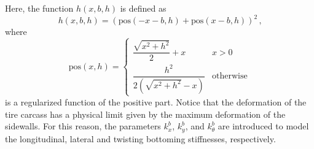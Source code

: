 %
Here, the function $h(x,b,h)$ is defined as
%
\begin{equation*}
  h(x,b,h) = \left(\mathrm{pos}(-x-b, h) + \mathrm{pos}(x-b, h)\right)^2 \, \text{,}
\end{equation*}
%
where
%
\begin{equation*}
  \mathrm{pos}(x,h) =
  \begin{cases}
    \dfrac{\sqrt{x^2 + h^2}}{2}+x    & x > 0 \\[0.5em]
    \dfrac{h^2}{2(\sqrt{x^2+h^2}-x)} & \mathrm{otherwise}
  \end{cases}
\end{equation*}
%
is a regularized function of the positive part. Notice that the deformation of the tire carcass has a physical limit given by the maximum deformation of the sidewalls. For this reason, the parameters $k_x^b$, $k_y^b$, and $k_\theta^b$ are introduced to model the longitudinal, lateral and twisting bottoming stiffnesses, respectively.

